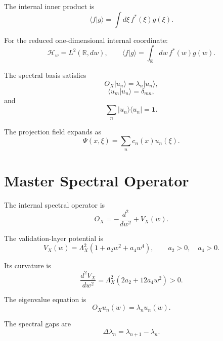 \documentclass[11pt]{article}
\begin{document}
The internal inner product is
\begin{equation}
\langle f|g\rangle
=
\int d\xi\, f^*(\xi)g(\xi).
\end{equation}

For the reduced one-dimensional internal coordinate:
\begin{equation}
\mathcal H_w=L^2(\mathbb R,dw),
\qquad
\langle f|g\rangle
=
\int_{\mathbb R}dw\,f^*(w)g(w).
\end{equation}

The spectral basis satisfies
\begin{equation}
O_X|u_n\rangle=\lambda_n|u_n\rangle,
\end{equation}
\begin{equation}
\langle u_m|u_n\rangle=\delta_{mn},
\end{equation}
and
\begin{equation}
\boxed{
\sum_n|u_n\rangle\langle u_n|=\mathbf 1.
}
\end{equation}

The projection field expands as
\begin{equation}
\boxed{
\Psi(x,\xi)
=
\sum_n c_n(x)u_n(\xi).
}
\end{equation}


\section{Master Spectral Operator}

The internal spectral operator is
\begin{equation}
\boxed{
O_X
=
-\frac{d^2}{dw^2}
+
V_X(w).
}
\end{equation}

The validation-layer potential is
\begin{equation}
V_X(w)
=
\Lambda_X^2
\left(
1+a_2w^2+a_4w^4
\right),
\qquad
a_2>0,\quad a_4>0.
\end{equation}

Its curvature is
\begin{equation}
\frac{d^2V_X}{dw^2}
=
\Lambda_X^2
\left(
2a_2+12a_4w^2
\right)>0.
\end{equation}

The eigenvalue equation is
\begin{equation}
O_Xu_n(w)=\lambda_nu_n(w).
\end{equation}

The spectral gaps are
\begin{equation}
\Delta\lambda_n=\lambda_{n+1}-\lambda_n.
\end{equation}
\end{document}
